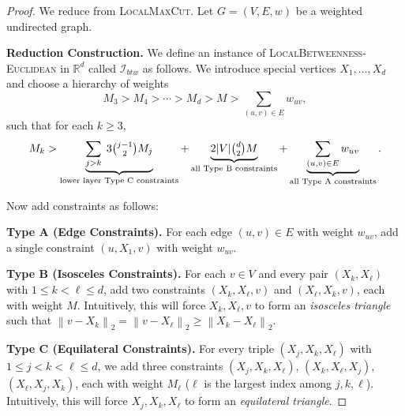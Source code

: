 \documentclass{article}
\theoremstyle{definition}  %
\theoremstyle{plain}
\numberwithin{observation}{section}
\numberwithin{claim}{section}
\numberwithin{fact}{section}
\numberwithin{lemma}{section}
\numberwithin{proposition}{section}
\numberwithin{theorem}{section}
\numberwithin{corollary}{section}
\numberwithin{definition}{section}
\newcommand{\calI}{\ensuremath{\mathcal{I}}}
\newcommand{\norm}[1]{\left\| #1 \right\|}
\theoremstyle{plain}
\begin{document}
\begin{proof}
We reduce from \textsc{LocalMaxCut}.
Let $G = (V, E, w)$ be a weighted undirected graph.

\textbf{Reduction Construction.}
We define an instance of \textsc{LocalBetweenness-Euclidean} in $\mathbb{R}^d$ called $\calI_{btw}$ as follows. We introduce special vertices $X_1,\dots,X_d$ and choose a hierarchy of weights
\[
M_3 > M_4 > \cdots > M_d > M > \sum_{(u,v) \in E} w_{uv},
\]
such that for each $k\ge3$,
\[
M_k > \underbrace{\sum_{j>k} \; 3 \tbinom{j-1}{2} M_j}_{\text{lower layer Type C constraints}} 
    + \underbrace{2 |V| \tbinom{d}{2} M}_{\text{all Type B constraints}} 
    + \underbrace{\sum_{(u,v) \in E} w_{uv}}_{\text{all Type A constraints}}.
\]

Now add constraints as follows:

\textbf{Type A (Edge Constraints).}  
For each edge $(u, v) \in E$ with weight $w_{uv}$, add a single constraint $(u, X_1, v)$ with weight $w_{uv}$.





\textbf{Type B (Isosceles Constraints).}
For each $v \in V$ and every pair $(X_k, X_\ell)$ with $1 \leq k < \ell \leq d$,
add two constraints $(X_k, X_\ell, v)$ and $(X_\ell, X_k, v)$, each with weight $M$. Intuitively, this will force $X_k, X_\ell, v$ to form an \emph{isosceles triangle} such that $\norm{ v - X_k }_2 = \norm{ v - X_\ell }_2 \geq \norm{ X_k - X_\ell }_2$.

\textbf{Type C (Equilateral Constraints).}
For every triple $(X_j, X_k, X_\ell)$ with $1 \leq j < k < \ell \leq d$, we add three constraints $(X_j, X_k, X_\ell)$, $(X_k, X_\ell, X_j)$, $(X_\ell, X_j, X_k)$,
each with weight $M_\ell$ ($\ell$ is the largest index among $j,k,\ell$).
Intuitively, this will force $X_j, X_k, X_\ell$ to form an \emph{equilateral triangle}.


\end{proof}
\end{document}
